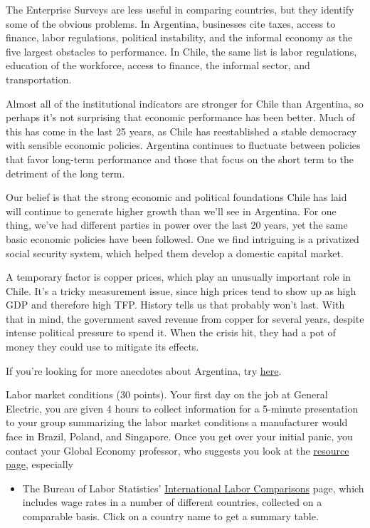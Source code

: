 \documentclass[12pt]{exam}
\begin{document}
\begin{questions}
\begin{solution}
\begin{parts}
\bigskip
The Enterprise Surveys are less useful in comparing countries,
but they identify some of the obvious problems.
In Argentina, businesses cite
taxes, access to finance, labor regulations, political instability,
and the informal economy as the five largest obstacles to performance.
In Chile, the same list is labor regulations, education of the workforce,
access to finance, the informal sector, and transportation.

Almost all of the institutional indicators are stronger for Chile
than Argentina, so perhaps it's not surprising that economic performance
has been better.
Much of this has come in the last 25 years, as Chile has reestablished a
stable democracy with sensible economic policies.
Argentina continues to fluctuate between policies that favor long-term
performance and those that focus on the short term to the detriment of
the long term.

Our belief is that the strong economic and political
foundations Chile has laid will continue to generate higher growth
than we'll see in Argentina.
For one thing, we've had different parties in power over the last 20 years,
yet the same basic economic policies have been followed.
One we find intriguing is a privatized social security system,
which helped them develop a domestic capital market.

A temporary factor is copper prices,
which play an unusually important role in Chile.
It's a tricky measurement issue, since
high prices  tend to show up as high GDP
and therefore high TFP.
History tells us that probably won't last.
With that in mind, the government saved revenue from copper
for several years,
despite intense political pressure to spend it.
When the crisis hit, they had a pot of money they could use to mitigate
its effects.

If you're looking for more anecdotes about Argentina,
try
\href{http://en.search.wordpress.com/?q=argentina&site=nyusterneconomics.wordpress.com}{here}.
\end{parts}
\end{solution}

\question Labor market conditions (30 points).
Your first day on the job at General Electric,
you are given 4 hours to collect information for a 5-minute
presentation to your group summarizing the labor market
conditions a manufacturer would face in Brazil, Poland, and Singapore.
Once you get over your initial panic, you contact your Global Economy
professor, who suggests you look at the
\href{http://pages.stern.nyu.edu/~dbackus/macro_resources.htm}{resource page},
especially
%
\begin{itemize}
\item The Bureau of Labor Statistics'
\href{http://www.bls.gov/fls/}{International Labor Comparisons}
page, which includes wage rates in a number of different countries,
collected on a comparable basis.
Click on a country name to get a summary table.


\end{itemize}
\end{questions}
\end{document}
